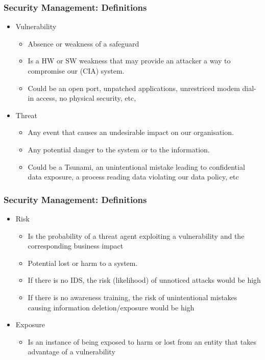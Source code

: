 \documentclass{beamer}
\begin{document}
\begin{frame}
\frametitle{Security Management: Definitions}
\begin{itemize}

\item Vulnerability
  \begin{itemize}
  \item Absence or weakness of a safeguard
  \item Is a HW or SW weakness that may provide an attacker a way to compromise our (CIA) system.
  \item Could be an open port, unpatched applications, unrestriced modem dial-in access, no physical security, etc,
  \end{itemize}
\item Threat
  \begin{itemize}
  \item Any event that causes an undesirable impact on our organisation.
  \item Any potential danger to the system or to the information.
  \item Could be a Tsunami, an unintentional mistake leading to confidential data exposure, a process reading data violating our data policy, etc
  \end{itemize}
\end{itemize}
\end{frame}



\begin{frame}
\frametitle{Security Management: Definitions}
\begin{itemize}

\item Risk
  \begin{itemize}
  \item Is the probability of a threat agent exploiting a vulnerability and the corresponding business impact
  \item Potential lost or harm to a system.
  \item If there is no IDS, the risk (likelihood) of unnoticed attacks would be high
  \item If there is no awareness training, the risk of unintentional mistakes causing information deletion/exposure would be high
  \end{itemize}
\item Exposure
  \begin{itemize}
  \item Is an instance of being exposed to harm or lost from an entity that takes advantage of a vulnerability
  \end{itemize}
\end{itemize}
\end{frame}
\end{document}
